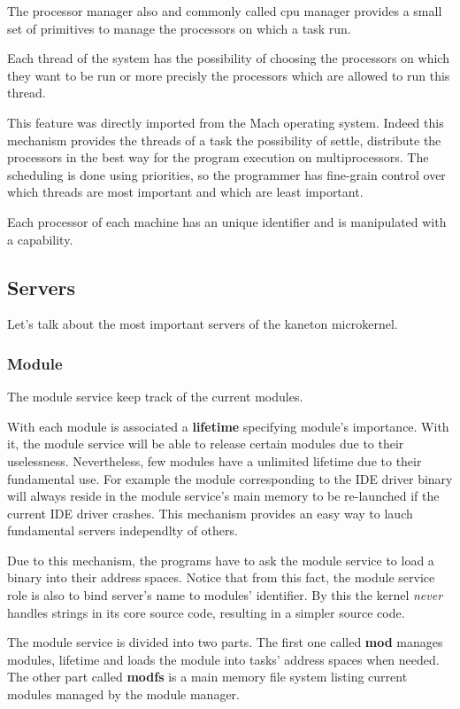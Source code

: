 \documentclass[10pt,a4wide]{article}
\begin{document}
\begin{multicols}{2}
The processor manager also and commonly called cpu manager provides a small
set of primitives to manage the processors on which a task run.

Each thread of the system has the possibility of choosing the processors
on which they want to be run or more precisly the processors which are allowed
to run this thread.

This feature was directly imported from the Mach operating system.
Indeed this mechanism provides the threads of a task the possibility of
settle, distribute the processors in the best way for the program
execution on multiprocessors. The scheduling is done using priorities,
so the programmer has fine-grain control over which threads
are most important and which are least important.

Each processor of each machine has an unique identifier and is manipulated
with a capability.

\subsection{Servers}

Let's talk about the most important servers of the kaneton microkernel.

\subsubsection{Module}

The module service keep track of the current modules.

With each module is associated a \textbf{lifetime} specifying module's
importance. With it, the module service will be able to release certain
modules due to their uselessness. Nevertheless, few modules have a
unlimited lifetime due to their fundamental use. For example the module
corresponding to the IDE driver binary will always reside in the module
service's main memory to be re-launched if the current IDE driver crashes.
This mechanism provides an easy way to lauch fundamental servers independlty
of others.

Due to this mechanism, the programs have to ask the module service to load
a binary into their address spaces. Notice that from this fact, the module
service role is also to bind server's name to modules' identifier. By this
the kernel \textit{never} handles strings in its core source code, resulting
in a simpler source code.

The module service is divided into two parts. The first one called \textbf{mod}
manages modules, lifetime and loads the module into tasks' address spaces
when needed. The other part called \textbf{modfs} is a main memory file
system listing current modules managed by the module manager.


\end{multicols}
\end{document}
